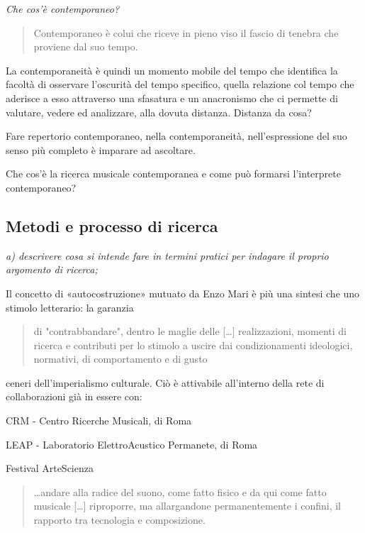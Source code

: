 \documentclass{gs-adonis}
\begin{document}
\emph{Che cos'è contemporaneo?}

\begin{quote}
  Contemporaneo è colui che riceve in pieno viso il fascio di tenebra che proviene dal suo tempo. \cite{agamben2008che}
\end{quote}

La contemporaneità è quindi un momento mobile del tempo che identifica la
facoltà di osservare l’oscurità del tempo specifico, quella relazione col
tempo che aderisce a esso attraverso una sfasatura e un anacronismo che ci
permette di valutare, vedere ed analizzare, alla dovuta distanza. Distanza da
cosa?

Fare repertorio contemporaneo, nella contemporaneità, nell’espressione del suo
senso più completo è imparare ad ascoltare.

Che cos'è la ricerca musicale contemporanea e come può formarsi l'interprete
contemporaneo?

\subsection{Metodi e processo di ricerca}%

\emph{a) descrivere cosa si intende fare in termini pratici per indagare il proprio argomento di ricerca;}

Il concetto di «autocostruzione» mutuato da Enzo Mari \cite{mari2002} è più una
sintesi che uno stimolo letterario: la garanzia

\begin{quote}
  di "contrabbandare", dentro le maglie delle […] realizzazioni, momenti di
  ricerca e contributi per lo stimolo a uscire dai condizionamenti ideologici,
  normativi, di comportamento e di gusto
\end{quote}

ceneri dell'imperialismo culturale. Ciò è attivabile all'interno della rete di
collaborazioni già in essere con:

CRM - Centro Ricerche Musicali, di Roma

LEAP - Laboratorio ElettroAcustico Permanete, di Roma

Festival ArteScienza


\begin{quote}
  …andare alla radice del suono, come fatto fisico e da qui come fatto musicale […] riproporre, ma allargandone permanentemente i confini, il rapporto tra tecnologia e composizione.
\end{quote}
\end{document}
